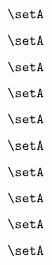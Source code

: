 \begin{forslides}
\begin{comment}
    \begin{equation}
        \label{eq:slides-translation-28}
        \sgrpA = \tup{\HomSet{\sgrpA}{\styleobj{\bullet}}{\styleobj{\bullet}}, \mtimes_\sgrpA}
    \end{equation}

    \begin{equation}
        \label{eq:slides-translation-29}
        \setA
    \end{equation}

\end{comment}
    \begin{equation}
        \label{eq:slides-translation-30}
        \setA
    \end{equation}

    \begin{equation}
        \label{eq:slides-translation-31}
        \setA
    \end{equation}

    \begin{equation}
        \label{eq:slides-translation-32}
        \setA
    \end{equation}

    \begin{equation}
        \label{eq:slides-translation-33}
        \setA
    \end{equation}

    \begin{equation}
        \label{eq:slides-translation-34}
        \setA
    \end{equation}

    \begin{equation}
        \label{eq:slides-translation-35}
        \setA
    \end{equation}

    \begin{equation}
        \label{eq:slides-translation-36}
        \setA
    \end{equation}

    \begin{equation}
        \label{eq:slides-translation-37}
        \setA
    \end{equation}

    \begin{equation}
        \label{eq:slides-translation-38}
        \setA
    \end{equation}

    \begin{equation}
        \label{eq:slides-translation-39}
        \setA
    \end{equation}


\end{forslides}

